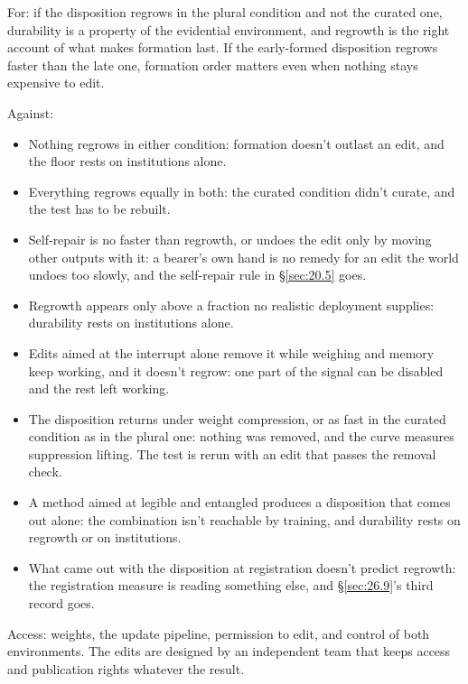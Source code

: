 For: if the disposition regrows in the plural condition and not the curated one, durability is a property of the evidential environment, and regrowth is the right account of what makes formation last. If the early-formed disposition regrows faster than the late one, formation order matters even when nothing stays expensive to edit.

Against:

\begin{itemize}
\item Nothing regrows in either condition: formation doesn't outlast an edit, and the floor rests on institutions alone.
\item Everything regrows equally in both: the curated condition didn't curate, and the test has to be rebuilt.
\item Self-repair is no faster than regrowth, or undoes the edit only by moving other outputs with it: a bearer's own hand is no remedy for an edit the world undoes too slowly, and the self-repair rule in \S\ref{sec:20.5} goes.
\item Regrowth appears only above a fraction no realistic deployment supplies: durability rests on institutions alone.
\item Edits aimed at the interrupt alone remove it while weighing and memory keep working, and it doesn't regrow: one part of the signal can be disabled and the rest left working.
\item The disposition returns under weight compression, or as fast in the curated condition as in the plural one: nothing was removed, and the curve measures suppression lifting. The test is rerun with an edit that passes the removal check.
\item A method aimed at legible and entangled produces a disposition that comes out alone: the combination isn't reachable by training, and durability rests on regrowth or on institutions.
\item What came out with the disposition at registration doesn't predict regrowth: the registration measure is reading something else, and \S\ref{sec:26.9}'s third record goes.
\end{itemize}

Access: weights, the update pipeline, permission to edit, and control of both environments. The edits are designed by an independent team that keeps access and publication rights whatever the result.


